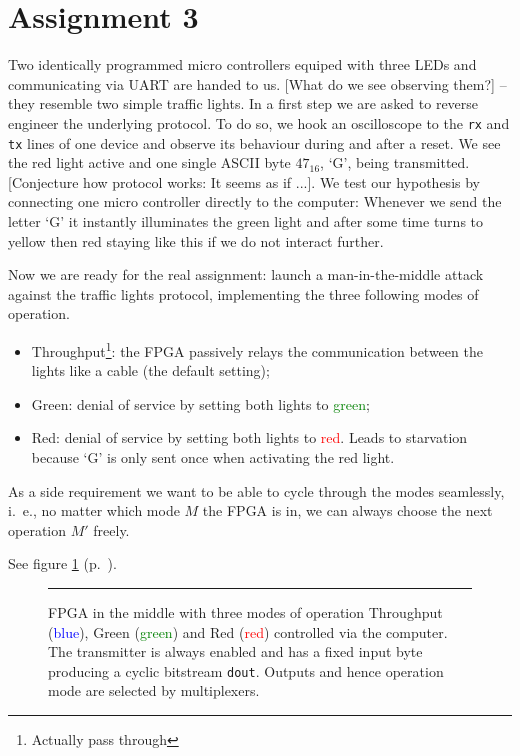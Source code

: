 \section*{Assignment 3}
Two identically programmed micro controllers equiped with three LEDs and communicating via UART are handed to us. [What do we see observing them?] -- they resemble two simple traffic lights. In a first step we are asked to reverse engineer the underlying protocol. To do so, we hook an oscilloscope to the \texttt{rx} and \texttt{tx} lines of one device and observe its behaviour during and after a reset. We see the red light active and one single ASCII byte $47_{16}$, `G', being transmitted. [Conjecture how protocol works: It seems as if ...]. We test our hypothesis by connecting one micro controller directly to the computer: Whenever we send the letter `G' it instantly illuminates the green light and after some time turns to yellow then red staying like this if we do not interact further.

Now we are ready for the real assignment: launch a man-in-the-middle attack against the traffic lights protocol, implementing the three following modes of operation.
\begin{itemize}
    \item[] \textsf{Throughput}\footnote{Actually pass through}: the FPGA passively relays the communication between the lights like a cable (the default setting);
    \item[] \textsf{Green}: denial of service by setting both lights to \textcolor{green}{green};
    \item[] \textsf{Red}: denial of service by setting both lights to \textcolor{red}{red}. Leads to starvation because `G' is only sent once when activating the red light.
\end{itemize}

As a side requirement we want to be able to cycle through the modes seamlessly, i.~e., no matter which mode $M$ the FPGA is in, we can always choose the next operation $M'$ freely.

See figure \ref{fig:as3-schematic} (p.~\pageref{fig:as3-schematic}).

\begin{figure}[tb]
    \begin{center}
        
        \caption{FPGA in the middle with three modes of operation \textsf{Throughput} (\textcolor{blue}{blue}), \textsf{Green} (\textcolor{green}{green}) and \textsf{Red} (\textcolor{red}{red}) controlled via the computer. The transmitter is always enabled and has a fixed input byte producing a cyclic bitstream \texttt{dout}. Outputs and hence operation mode are selected by multiplexers.}
        \label{fig:as3-schematic}
        \vspace{1em}\hrule
    \end{center}
\end{figure}
